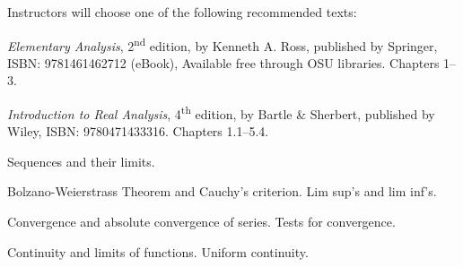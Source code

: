 \documentclass{osucourse}
\begin{document}
\CatalogDescription
\PrerequisitesAndExclusions

\begin{Text}
Instructors will choose one of the following recommended texts:

\emph{Elementary Analysis}, 2\textsuperscript{nd} edition, by Kenneth A.
Ross, published by Springer, ISBN: 9781461462712 (eBook), Available free
through OSU libraries. Chapters 1--3.

\emph{Introduction to Real Analysis}, 4\textsuperscript{th} edition, by Bartle \&
Sherbert, published by Wiley, ISBN: 9780471433316. Chapters 1.1--5.4.
\end{Text}

\begin{TopicsList}
\item
  Sequences and their limits.
\item
  Bolzano-Weierstrass Theorem and Cauchy's criterion. Lim sup's and lim
  inf's.
\item
  Convergence and absolute convergence of series. Tests for convergence.
\item
  Continuity and limits of functions. Uniform continuity.
\end{TopicsList}

\begin{SuggestedSchedule}
\end{SuggestedSchedule}
\end{document}
